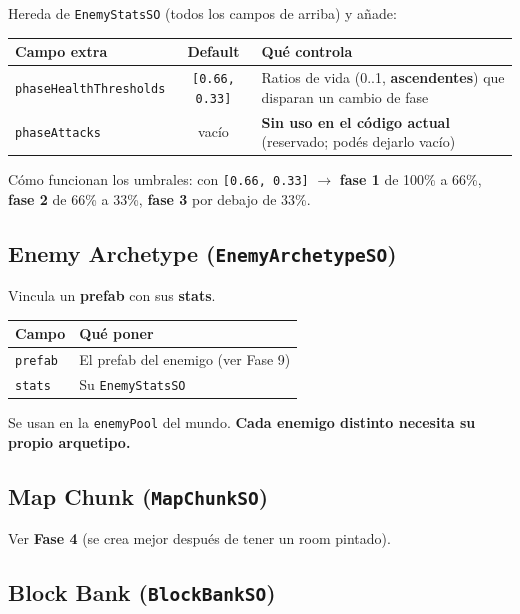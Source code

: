 \documentclass[a4paper,12pt]{article}
\newcommand{\code}[1]{\texttt{#1}}
\begin{document}
Hereda de \code{EnemyStatsSO} (todos los campos de arriba) y añade:

\begin{center}
\begin{tabular}{|l|c|p{6.6cm}|}
\hline
\textbf{Campo extra} & \textbf{Default} & \textbf{Qué controla} \\
\hline
\code{phaseHealthThresholds} & \code{[0.66, 0.33]} & Ratios de vida (0..1, \textbf{ascendentes}) que disparan un cambio de fase \\
\hline
\code{phaseAttacks} & vacío & \textbf{Sin uso en el código actual} (reservado; podés dejarlo vacío) \\
\hline
\end{tabular}
\end{center}

Cómo funcionan los umbrales: con \code{[0.66, 0.33]} $\to$ \textbf{fase 1} de 100\% a 66\%,
\textbf{fase 2} de 66\% a 33\%, \textbf{fase 3} por debajo de 33\%.

\subsection{Enemy Archetype (\code{EnemyArchetypeSO})}

Vincula un \textbf{prefab} con sus \textbf{stats}.

\begin{center}
\begin{tabular}{|l|p{9cm}|}
\hline
\textbf{Campo} & \textbf{Qué poner} \\
\hline
\code{prefab} & El prefab del enemigo (ver Fase 9) \\
\hline
\code{stats} & Su \code{EnemyStatsSO} \\
\hline
\end{tabular}
\end{center}

Se usan en la \code{enemyPool} del mundo. \textbf{Cada enemigo distinto necesita su propio
arquetipo.}

\subsection{Map Chunk (\code{MapChunkSO})}

Ver \textbf{Fase 4} (se crea mejor después de tener un room pintado).

\subsection{Block Bank (\code{BlockBankSO})}
\end{document}
